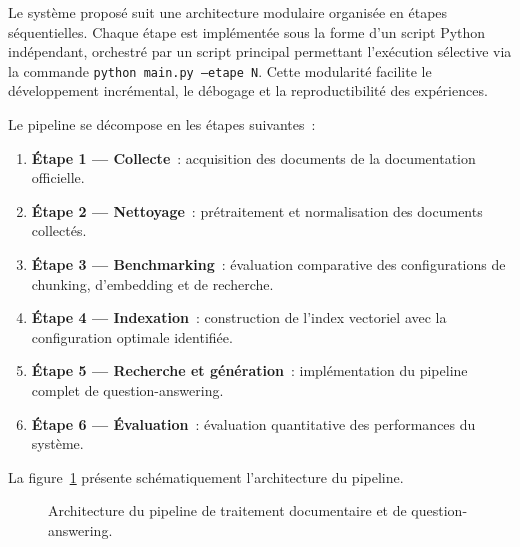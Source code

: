 \documentclass[12pt,a4paper,oneside]{report}
\begin{document}
Le système proposé suit une architecture modulaire organisée en étapes séquentielles. Chaque étape est implémentée sous la forme d'un script Python indépendant, orchestré par un script principal permettant l'exécution sélective via la commande \texttt{python main.py --etape N}. Cette modularité facilite le développement incrémental, le débogage et la reproductibilité des expériences.

Le pipeline se décompose en les étapes suivantes~:

\begin{enumerate}
  \item \textbf{Étape 1 --- Collecte}~: acquisition des documents de la documentation officielle.
  \item \textbf{Étape 2 --- Nettoyage}~: prétraitement et normalisation des documents collectés.
  \item \textbf{Étape 3 --- Benchmarking}~: évaluation comparative des configurations de chunking, d'embedding et de recherche.
  \item \textbf{Étape 4 --- Indexation}~: construction de l'index vectoriel avec la configuration optimale identifiée.
  \item \textbf{Étape 5 --- Recherche et génération}~: implémentation du pipeline complet de question-answering.
  \item \textbf{Étape 6 --- Évaluation}~: évaluation quantitative des performances du système.
\end{enumerate}

La figure~\ref{fig:pipeline} présente schématiquement l'architecture du pipeline.

\begin{figure}[H]
\centering
{}
\caption{Architecture du pipeline de traitement documentaire et de question-answering.}
\label{fig:pipeline}
\end{figure}
\end{document}
